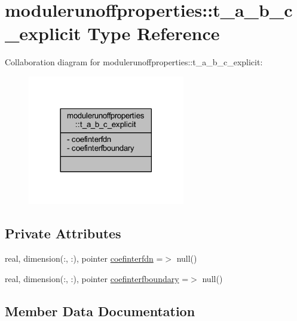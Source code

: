 \hypertarget{structmodulerunoffproperties_1_1t__a__b__c__explicit}{}\section{modulerunoffproperties\+:\+:t\+\_\+a\+\_\+b\+\_\+c\+\_\+explicit Type Reference}
\label{structmodulerunoffproperties_1_1t__a__b__c__explicit}


Collaboration diagram for modulerunoffproperties\+:\+:t\+\_\+a\+\_\+b\+\_\+c\+\_\+explicit\+:\nopagebreak
\begin{figure}[H]
\begin{center}
\leavevmode
\includegraphics[width=194pt]{structmodulerunoffproperties_1_1t__a__b__c__explicit__coll__graph}
\end{center}
\end{figure}
\subsection*{Private Attributes}
\begin{DoxyCompactItemize}
\item 
real, dimension(\+:, \+:), pointer \mbox{\hyperlink{structmodulerunoffproperties_1_1t__a__b__c__explicit_a56ffb9f93b06e5584da96f66f2759de1}{coefinterfdn}} =$>$ null()
\item 
real, dimension(\+:, \+:), pointer \mbox{\hyperlink{structmodulerunoffproperties_1_1t__a__b__c__explicit_aa46d2b826e77eb3da6586ecb4521ed44}{coefinterfboundary}} =$>$ null()
\end{DoxyCompactItemize}


\subsection{Member Data Documentation}
\mbox{\label{structmodulerunoffproperties_1_1t__a__b__c__explicit_aa46d2b826e77eb3da6586ecb4521ed44}} 
